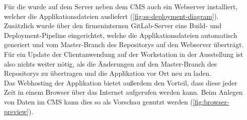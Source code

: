 Für die \shst{} wurde auf dem Server neben dem CMS auch ein Webserver installiert, welcher die 
Applikationsdateien ausliefert (\autoref{fig:ss-deployment-diagram}). Zusätzlich wurde über den 
firmeninternen GitLab-Server \cite{gitlab} eine Build- und Deployment-Pipeline eingerichtet, welche die 
Applikationsdateien automatisch generiert und vom Master-Branch des Repositorys auf den Webserver überträgt. 
Für ein Update der Clientanwendung auf der Workstation in der Ausstellung ist also nichts weiter 
nötig, als die Änderungen auf den Master-Branch des Repositorys zu übertragen und die Applikation vor
Ort neu zu laden.\\
Das Webhosting der Applikation bietet außerdem den Vorteil, dass diese jeder Zeit in einem Browser 
über das Internet aufgerufen werden kann. Beim Anlegen von Daten im CMS kann dies so als
Vorschau genutzt werden (\autoref{fig:browser-preview}). 